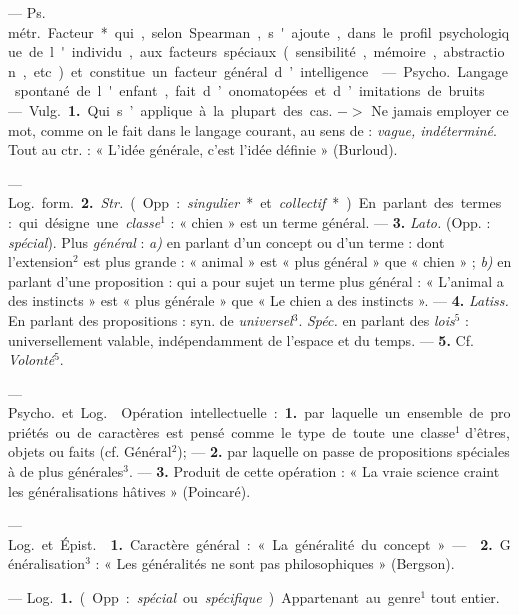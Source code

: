 
	\begin{itemize}[leftmargin=1cm, label=, itemsep=1pt]

 — \si{Ps. métr.} Facteur* qui, selon Spearman, s'ajoute,
dans le profil psychologique de l'individu, aux facteurs spéciaux
(sensibilité, mémoire, abstraction, etc.) et constitue un facteur général
d’intelligence.

 — \si{Psycho.} Langage spontané de l'enfant, fait
d’onomatopées et d’imitations de bruits.

 — \si{Vulg.} {\bf 1.} Qui s’applique à la plupart des cas.
$->$ Ne jamais employer ce mot, comme on le fait dans le langage courant,
au sens de : {\it vague, indéterminé}. Tout au ctr. : « L'idée générale,
c’est l’idée définie » (Burloud).

— \si{Log.} \si{form.} {\bf 2.} {\it Str.} (Opp. : {\it singulier}* et
{\it collectif}*). En parlant des termes : qui désigne une {\it classe}$^1$ :
« chien » est un terme général. — {\bf 3.} {\it Lato.} (Opp. :
{\it spécial}). Plus {\it général} : {\it a)} en parlant d’un concept ou d’un
terme : dont l'extension$^2$ est plus grande : « animal » est « plus
général » que « chien » ; {\it b)} en parlant d'une proposition : qui a pour
sujet un terme plus général : « L’animal a des instincts » est « plus
générale » que « Le chien a des instincts ». — {\bf 4.} {\it Latiss.} En
parlant des propositions : syn. de {\it universel}$^3$. {\it Spéc.} en
parlant des {\it lois}$^5$ : universellement valable, indépendamment de
l’espace et du temps. — {\bf 5.} Cf. {\it Volonté}$^5$.

 — \si{Psycho.} et \si{Log.}  Opération
intellectuelle : {\bf 1.} par laquelle un ensemble de propriétés ou de
caractères est pensé comme le type de toute une classe$^1$ d'êtres, objets ou
faits (cf. Général$^2$); — {\bf 2.} par laquelle on passe de propositions
spéciales à de plus générales$^3$. —  {\bf 3.} Produit de
cette opération : « La vraie science craint les généralisations hâtives »
(Poincaré).

 — \si{Log.} et \si{Épist.}  {\bf 1.} Caractère
général : « La généralité du concept ». —  {\bf 2.}
Généralisation$^3$ : « Les généralités ne sont pas philosophiques » (Bergson).

 — \si{Log.} {\bf 1.} (Opp. : {\it spécial}
ou {\it spécifique}). Appartenant au genre$^1$ tout entier.


\end{itemize}

